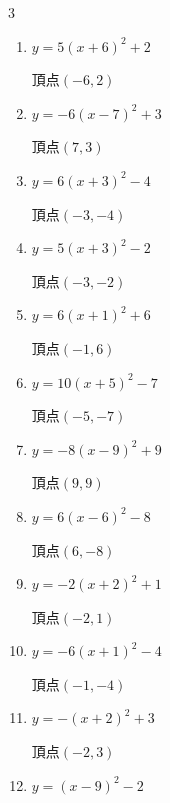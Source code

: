 \begin{multicols}{3}
\begin{enumerate}
  \item $\displaystyle y=5\left( x+6\right)^{2}+2$

        $\displaystyle 頂点\left( -6 , 2 \right)$

  \item $\displaystyle y=-6\left( x-7\right)^{2}+3$

        $\displaystyle 頂点\left( 7 , 3 \right)$

  \item $\displaystyle y=6\left( x+3\right)^{2}-4$

        $\displaystyle 頂点\left( -3 , -4 \right)$

  \item $\displaystyle y=5\left( x+3\right)^{2}-2$

        $\displaystyle 頂点\left( -3 , -2 \right)$

  \item $\displaystyle y=6\left( x+1\right)^{2}+6$

        $\displaystyle 頂点\left( -1 , 6 \right)$

  \item $\displaystyle y=10\left( x+5\right)^{2}-7$

        $\displaystyle 頂点\left( -5 , -7 \right)$

  \item $\displaystyle y=-8\left( x-9\right)^{2}+9$

        $\displaystyle 頂点\left( 9 , 9 \right)$

  \item $\displaystyle y=6\left( x-6\right)^{2}-8$

        $\displaystyle 頂点\left( 6 , -8 \right)$

\columnbreak %

  \item $\displaystyle y=-2\left( x+2\right)^{2}+1$

        $\displaystyle 頂点\left( -2 , 1 \right)$

  \item $\displaystyle y=-6\left( x+1\right)^{2}-4$

        $\displaystyle 頂点\left( -1 , -4 \right)$

  \item $\displaystyle y=-\left( x+2\right)^{2}+3$

        $\displaystyle 頂点\left( -2 , 3 \right)$

  \item $\displaystyle y=\left( x-9\right)^{2}-2$


\end{enumerate}
\end{multicols}
